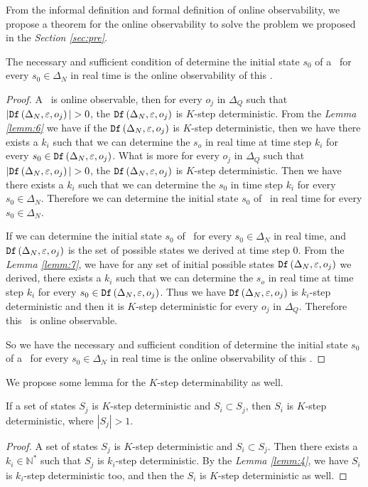From the informal definition and formal definition of online observability, we propose a theorem for the online observability to solve the problem we proposed in the {\em Section \ref{sec:pre}}.
\begin{theorem}
The necessary and sufficient condition of determine the initial state $s_0$ of a \BCN\ for every $s_0\in \Delta_N$ in real time is the online observability of this \BCN. 
\label{theo:1}
\end{theorem}
\begin{proof}
 A \BCN\ is online observable,
then for every  $o_j$ in $\Delta_Q$ such that $|\Ded\left(\Delta_N,\varepsilon, o_j\right)|> 0$, the ${\tt Df}\left(\Delta_N,\varepsilon,o_j\right)$ is $K$-step deterministic. From the {\em Lemma \ref{lemm:6}} we have if the ${\tt Df}\left(\Delta_N,\varepsilon,o_j\right)$ is $K$-step deterministic, then we have there exists a $k_i$ such that we can determine the $s_o$ in real time at time step $k_i$ for every $s_0\in {\tt Df}\left(\Delta_N,\varepsilon,o_j\right)$.  What is more for every  $o_j$ in $\Delta_Q$ such that $|\Ded\left(\Delta_N,\varepsilon, o_j\right)|> 0$, the ${\tt Df}\left(\Delta_N,\varepsilon,o_j\right)$ is $K$-step deterministic. Then we have there exists a $k_i$ such that we can determine the $s_0$ in time step $k_i$ for every $s_0\in \Delta_N$. Therefore we can determine the initial state $s_0$ of \BCNs\ in real time for every $s_0\in \Delta_N$.

If we can determine the initial state $s_0$ of \BCNs\ for every $s_0\in \Delta_N$ in real time, and ${\tt Df}\left(\Delta_N,\varepsilon,o_j\right)$ is the set of possible states we derived at time step $0$. From the {\em Lemma \ref{lemm:7}}, we have for any set of initial possible states ${\tt Df}\left(\Delta_N,\varepsilon,o_j\right)$ we derived, there exists a $k_i$ such that we can determine the $s_o$ in real time at time step $k_i$ for every $s_0\in {\tt Df}\left(\Delta_N,\varepsilon,o_j\right)$. Thus we have  ${\tt Df}\left(\Delta_N,\varepsilon,o_j\right)$ is $k_i$-step deterministic and then it is $K$-step deterministic for every  $o_j$ in $\Delta_Q$. Therefore this \BCN\ is online observable.

So we have the necessary and sufficient condition of determine the initial state $s_0$ of a \BCN\ for every $s_0\in \Delta_N$ in real time is the online observability of this \BCN. 
\end{proof}

We propose some lemma for the $K$-step determinability as well.
\begin{lemma}
 If a set of states $S_j$ is $K$-step deterministic and $S_i\subset S_j$, then $S_i$ is $K$-step deterministic, where $|S_j|>1$.
\label{lemm:3}
\end{lemma}
\begin{proof}A set of states $S_j$ is $K$-step deterministic and $S_i\subset S_j$. Then there exists a $k_i\in \mathbb{N}^*$ such that $S_j$ is $k_i$-step deterministic. By the {\em Lemma \ref{lemm:4}}, we have $S_i$ is $k_i$-step deterministic too, and then the $S_i$ is $K$-step deterministic as well.
\end{proof}

